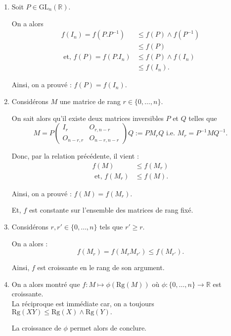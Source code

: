 \begin{enumerate}
\item Soit $P\in \mbox{GL}_{n}(\mathbb{R}).$

On a  alors 
\begin{align*}
f(I_{n})=f(P.P^{-1}) & \leq f(P)\wedge f(P^{-1})\\
& \leq f(P)\\
\mbox{ et, } f(P)=f(P.I_{n})& \leq f(P)\wedge f(I_{n})\\
& \leq f(I_{n}).
\end{align*}

Ainsi, on a prouvé : $\displaystyle f(P)=f(I_{n}).$

\item Considérons $M$ une matrice de rang $r\in \{0,\ldots,n\}.$

On sait alors qu'il existe deux matrices inversibles $P$ et $Q$ telles que  $$M=P\left( \begin{array}{ll}
I_{r} & O_{r,n-r}\\
O_{n-r,r} & O_{n-r,n-r}
\end{array}
\right) Q:=PM_{r}Q \mbox{ i.e. } M_{r}=P^{-1}MQ^{-1}.$$

Donc, par la relation précédente, il vient : 
\begin{align*}
f(M) & \leq f(M_{r})\\
\mbox{ et, } f(M_{r}) & \leq f(M).
\end{align*}

Ainsi, on a prouvé : $\displaystyle f(M)=f(M_{r}).$

Et, $f$ est constante sur l'ensemble des matrices de rang fixé.

\item Considérons $r,r'\in \{0,\ldots,n\}$ tels que $r'\geq r.$

On a alors : $$f(M_{r})=f(M_{r}M_{r'})\leq f(M_{r'}).$$

Ainsi, $f$ est croissante en le rang de son argument.
\item On a alors montré que $f: \displaystyle M\mapsto \phi(\mbox{Rg}(M))$ où $\displaystyle \phi : \{0,\ldots,n\}\rightarrow \mathbb{R}$ est croissante.\\ 

La réciproque est immédiate car, on a toujours $\displaystyle \mbox{Rg}(XY)\leq \mbox{Rg}(X)\wedge\mbox{Rg}(Y).$ 

La croissance de $\phi$ permet alors de conclure.
\end{enumerate}


